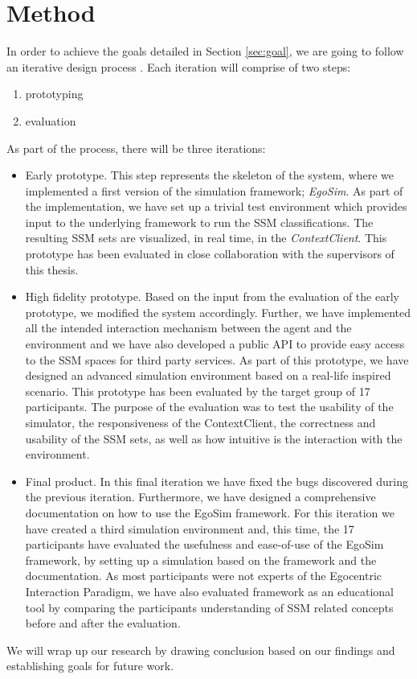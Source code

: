 \section{Method} %
\label{sec:method}

In order to achieve the goals detailed in Section \ref{sec:goal}, we are going to follow an iterative design process \cite{mackay1997hci}. Each iteration will comprise of two steps:
\begin{enumerate}
	\item prototyping
	\item evaluation
\end{enumerate}

As part of the process, there will be three iterations:
\begin{itemize}
	\item Early prototype. This step represents the skeleton of the system, where we implemented a first version of the simulation framework; \emph{EgoSim}. As part of the implementation, we have set up a trivial test environment which provides input to the underlying framework to run the SSM classifications. The resulting SSM sets are visualized, in real time, in the \emph{ContextClient}. This prototype has been evaluated in close collaboration with the supervisors of this thesis.
	\item High fidelity prototype. Based on the input from the evaluation of the early prototype, we modified the system accordingly. Further, we have implemented all the intended interaction mechanism between the agent and the environment and we have also developed a public API to provide easy access to the SSM spaces for third party services. As part of this prototype, we have designed an advanced simulation environment based on a real-life inspired scenario. This prototype has been evaluated by the target group of 17 participants. The purpose of the evaluation was to test the usability of the simulator, the responsiveness of the ContextClient, the correctness and usability of the SSM sets, as well as how intuitive is the interaction with the environment.
	\item Final product. In this final iteration we have fixed the bugs discovered during the previous iteration. Furthermore, we have designed a comprehensive documentation on how to use the EgoSim framework. For this iteration we have created a third simulation environment and, this time, the 17 participants have evaluated the usefulness and ease-of-use of the EgoSim framework, by setting up a simulation based on the framework and the documentation. As most participants were not experts of the Egocentric Interaction Paradigm, we have also evaluated framework as an educational tool by comparing the participants understanding of SSM related concepts before and after the evaluation.
\end{itemize}

We will wrap up our research by drawing conclusion based on our findings and establishing goals for future work.

